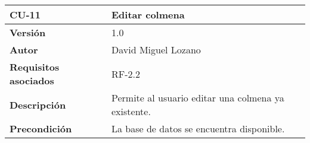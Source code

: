 \begin{longtable}[H]{@{}ll@{}}
\toprule
\begin{minipage}[b]{0.26\columnwidth}\raggedright\strut
\textbf{CU-11}\strut
\end{minipage} & \begin{minipage}[b]{0.68\columnwidth}\raggedright\strut
\textbf{Editar colmena}\strut
\end{minipage}\tabularnewline
\midrule
\endhead
\begin{minipage}[t]{0.26\columnwidth}\raggedright\strut
\textbf{Versión}\strut
\end{minipage} & \begin{minipage}[t]{0.68\columnwidth}\raggedright\strut
1.0\strut
\end{minipage}\tabularnewline
\begin{minipage}[t]{0.26\columnwidth}\raggedright\strut
\textbf{Autor}\strut
\end{minipage} & \begin{minipage}[t]{0.68\columnwidth}\raggedright\strut
David Miguel Lozano\strut
\end{minipage}\tabularnewline
\begin{minipage}[t]{0.26\columnwidth}\raggedright\strut
\textbf{Requisitos asociados}\strut
\end{minipage} & \begin{minipage}[t]{0.68\columnwidth}\raggedright\strut
RF-2.2\strut
\end{minipage}\tabularnewline
\begin{minipage}[t]{0.26\columnwidth}\raggedright\strut
\textbf{Descripción}\strut
\end{minipage} & \begin{minipage}[t]{0.68\columnwidth}\raggedright\strut
Permite al usuario editar una colmena ya existente.\strut
\end{minipage}\tabularnewline
\begin{minipage}[t]{0.26\columnwidth}\raggedright\strut
\textbf{Precondición}\strut
\end{minipage} & \begin{minipage}[t]{0.68\columnwidth}\raggedright\strut
La base de datos se encuentra disponible.


\end{minipage}
\end{longtable}
